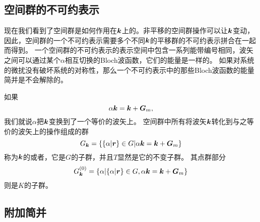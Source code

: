 \subsection{空间群的不可约表示}

现在我们看到了空间群是如何作用在$\vb*{k}$上的。非平移的空间群操作可以让$\vb*{k}$变动，因此，空间群的一个不可约表示需要多个不同$\vb*{k}$的平移群的不可约表示拼合在一起而得到。
一个空间群的不可约表示的表示空间中包含一系列能带编号相同，波矢之间可以通过某个$\alpha$相互切换的Bloch波函数，它们的能量是一样的。
如果对系统的微扰没有破坏系统的对称性，那么一个不可约表示中的那些Bloch波函数的能量简并是不会解除的。

如果
\begin{equation}
    \alpha \vb*{k} = \vb*{k} + \vb*{G}_m,
\end{equation}
我们就说$\alpha$把$\vb*{k}$变换到了一个等价的波矢上。
空间群中所有将波矢$\vb*{k}$转化到与之等价的波矢上的操作组成的群
\begin{equation}
    G_{\vb*{k}} = \{ \{\alpha | \vb*{r}\} \in G | \alpha \vb*{k} = \vb*{k} + \vb*{G}_m \}
\end{equation}
称为$\vb*{k}$的或者，它是$G$的子群，并且$T$显然是它的不变子群。
其点群部分
\begin{equation}
    G_{\vb*{k}}^{(0)} = \{ \alpha | \{\alpha | \vb*{r}\} \in G,  \alpha \vb*{k} = \vb*{k} + \vb*{G}_m \}
\end{equation}
则是$K$的子群。

\subsection{附加简并}

